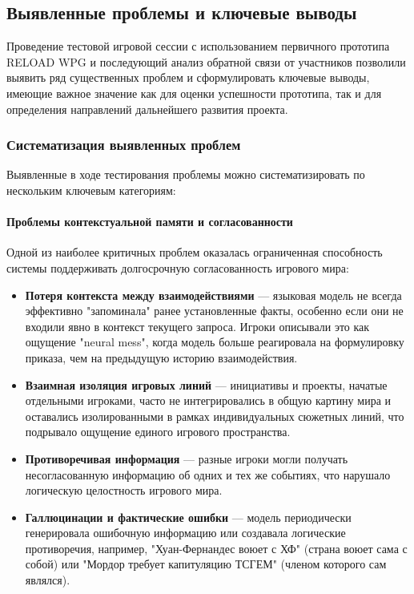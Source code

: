 \subsection{Выявленные проблемы и ключевые выводы}

Проведение тестовой игровой сессии с использованием первичного прототипа RELOAD WPG и последующий анализ обратной связи от участников позволили выявить ряд существенных проблем и сформулировать ключевые выводы, имеющие важное значение как для оценки успешности прототипа, так и для определения направлений дальнейшего развития проекта.

\subsubsection{Систематизация выявленных проблем}

Выявленные в ходе тестирования проблемы можно систематизировать по нескольким ключевым категориям:

\paragraph{Проблемы контекстуальной памяти и согласованности}

Одной из наиболее критичных проблем оказалась ограниченная способность системы поддерживать долгосрочную согласованность игрового мира:

\begin{itemize}
    \item \textbf{Потеря контекста между взаимодействиями} — языковая модель не всегда эффективно "{}запоминала"{} ранее установленные факты, особенно если они не входили явно в контекст текущего запроса. Игроки описывали это как ощущение "{}neural mess"{}, когда модель больше реагировала на формулировку приказа, чем на предыдущую историю взаимодействия.

    \item \textbf{Взаимная изоляция игровых линий} — инициативы и проекты, начатые отдельными игроками, часто не интегрировались в общую картину мира и оставались изолированными в рамках индивидуальных сюжетных линий, что подрывало ощущение единого игрового пространства.

    \item \textbf{Противоречивая информация} — разные игроки могли получать несогласованную информацию об одних и тех же событиях, что нарушало логическую целостность игрового мира.

    \item \textbf{Галлюцинации и фактические ошибки} — модель периодически генерировала ошибочную информацию или создавала логические противоречия, например, "{}Хуан-Фернандес воюет с ХФ"{} (страна воюет сама с собой) или "{}Мордор требует капитуляцию ТСГЕМ"{} (членом которого сам являлся).
\end{itemize}

